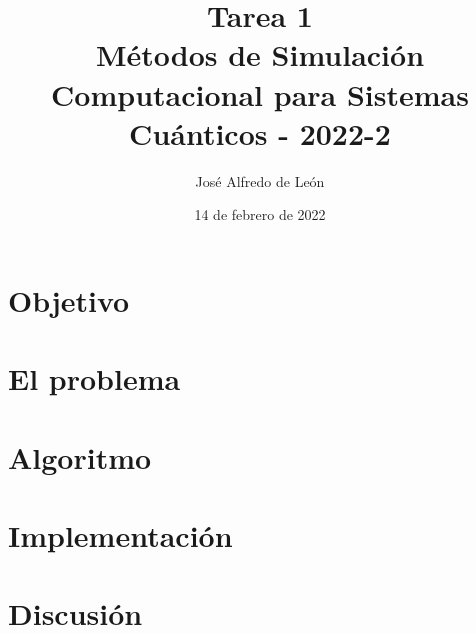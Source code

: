 \documentclass[11pt,letterpaper]{article}
\author{José Alfredo de León}
\title{Tarea 1\\
\large{Métodos de Simulación Computacional para Sistemas Cuánticos - 2022-2}}
\begin{document}
\date{14 de febrero de 2022}
\maketitle

\section{Objetivo}
\section{El problema}
\section{Algoritmo}
\section{Implementación}
\section{Discusión}
\end{document}
